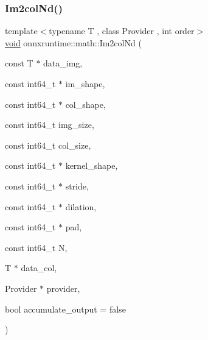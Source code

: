 \subsubsection{\texorpdfstring{Im2col\+Nd()}{Im2colNd()}}
{\footnotesize\ttfamily template$<$typename T , class Provider , int order$>$ \\
\mbox{\hyperlink{mlasi_8h_a88f941d423cb2a819b70a1358982b1a6}{void}} onnxruntime\+::math\+::\+Im2col\+Nd (\begin{DoxyParamCaption}\item[{const T $\ast$}]{data\+\_\+img,  }\item[{const int64\+\_\+t $\ast$}]{im\+\_\+shape,  }\item[{const int64\+\_\+t $\ast$}]{col\+\_\+shape,  }\item[{const int64\+\_\+t}]{img\+\_\+size,  }\item[{const int64\+\_\+t}]{col\+\_\+size,  }\item[{const int64\+\_\+t $\ast$}]{kernel\+\_\+shape,  }\item[{const int64\+\_\+t $\ast$}]{stride,  }\item[{const int64\+\_\+t $\ast$}]{dilation,  }\item[{const int64\+\_\+t $\ast$}]{pad,  }\item[{const int64\+\_\+t}]{N,  }\item[{T $\ast$}]{data\+\_\+col,  }\item[{Provider $\ast$}]{provider,  }\item[{bool}]{accumulate\+\_\+output = {\ttfamily false} }\end{DoxyParamCaption})}

\mbox{\label{namespaceonnxruntime_1_1math_a81ac2d7f2ea2b9bc15c568bc0733f7b9}} 
